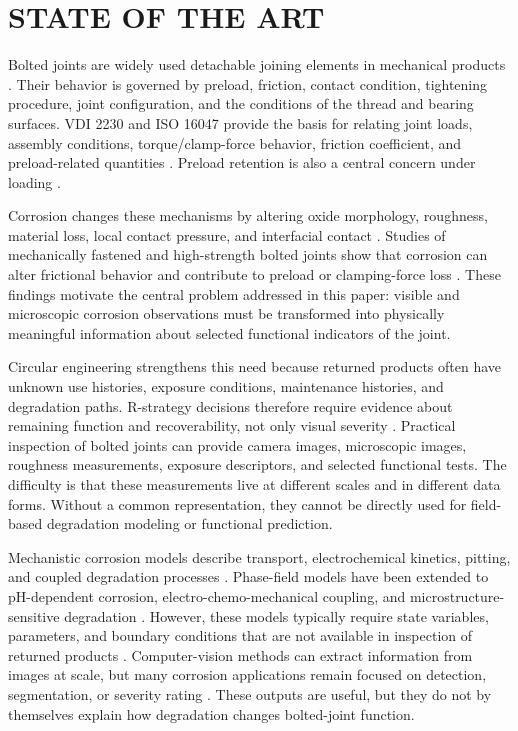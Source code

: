 \documentclass[colorlinks,upint,subscriptcorrection,varvw,hyphenate,balance]{asmeconf}
\begin{document}
\section{STATE OF THE ART}
Bolted joints are widely used detachable joining elements in mechanical
products \cite{bickford2007bolted,buda2003bolted}. Their behavior is governed
by preload, friction, contact condition, tightening procedure, joint
configuration, and the conditions of the thread and bearing surfaces. VDI 2230
and ISO 16047 provide the basis for relating joint loads, assembly conditions,
torque/clamp-force behavior, friction coefficient, and preload-related
quantities \cite{vdi2230part1,vdi2230part2,vdi2230part3,iso16047}. Preload
retention is also a central concern under loading \cite{junker1969}.

Corrosion changes these mechanisms by altering oxide morphology, roughness,
material loss, local contact pressure, and interfacial contact
\cite{king2023review,albert2024chemical}. Studies of mechanically fastened and
high-strength bolted joints show that corrosion can alter frictional behavior
and contribute to preload or clamping-force loss
\cite{saai2023galvanic,jiang2022preload,li2021clamping,shah2025guided}.
These findings motivate the central problem addressed in this paper: visible
and microscopic corrosion observations must be transformed into physically
meaningful information about selected functional indicators of the joint.

Circular engineering strengthens this need because returned products often have
unknown use histories, exposure conditions, maintenance histories, and
degradation paths. R-strategy decisions therefore require evidence about
remaining function and recoverability, not only visual severity
\cite{potting2017circular,reike2018rs}. Practical inspection of bolted joints
can provide camera images, microscopic images, roughness measurements, exposure
descriptors, and selected functional tests. The difficulty is that these
measurements live at different scales and in different data forms. Without a
common representation, they cannot be directly used for field-based degradation
modeling or functional prediction.

Mechanistic corrosion models describe transport, electrochemical kinetics,
pitting, and coupled degradation processes
\cite{mai2016phasefield,ansari2018phasefield}. Phase-field models have been
extended to pH-dependent corrosion, electro-chemo-mechanical coupling, and
microstructure-sensitive degradation
\cite{tsuyuki2018ph,cui2023ecm,makuch2024micro}. However, these models
typically require state variables, parameters, and boundary conditions that are
not available in inspection of returned products
\cite{king2023review,martinezpaneda2024review}. Computer-vision methods can
extract information from images at scale, but many corrosion applications
remain focused on detection, segmentation, or severity rating
\cite{wu2025fusion,vangrunderbeek2025field}. These outputs are useful, but
they do not by themselves explain how degradation changes bolted-joint
function.
\end{document}
